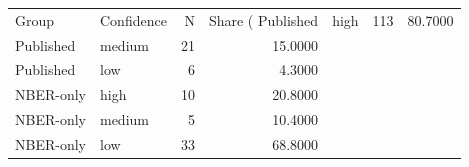 \begin{tabular}{llrr}
\toprule
Group & Confidence & N & Share (%
\midrule
Published & high & 113 & 80.7000 \\
Published & medium & 21 & 15.0000 \\
Published & low & 6 & 4.3000 \\
NBER-only & high & 10 & 20.8000 \\
NBER-only & medium & 5 & 10.4000 \\
NBER-only & low & 33 & 68.8000 \\
\bottomrule
\end{tabular}
